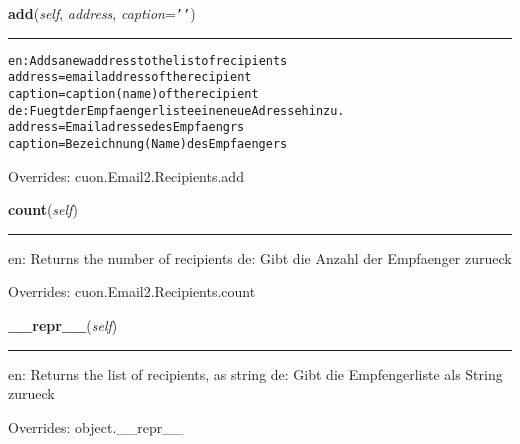 \hspace{.8\funcindent}\begin{boxedminipage}{\funcwidth}

    \raggedright \textbf{add}(\textit{self}, \textit{address}, \textit{caption}={\tt \texttt{'}\texttt{}\texttt{'}})

    \vspace{-1.5ex}

    \rule{\textwidth}{0.5\fboxrule}
\setlength{\parskip}{2ex}
\begin{alltt}

en: Adds a new address to the list of recipients
    address = email address of the recipient
    caption = caption (name) of the recipient
de: Fuegt der Empfaengerliste eine neue Adresse hinzu.
    address = Emailadresse des Empfaengrs
    caption = Bezeichnung (Name) des Empfaengers
\end{alltt}

\setlength{\parskip}{1ex}
      Overrides: cuon.Email2.Recipients.add

    \end{boxedminipage}

    \vspace{0.5ex}

\hspace{.8\funcindent}\begin{boxedminipage}{\funcwidth}

    \raggedright \textbf{count}(\textit{self})

    \vspace{-1.5ex}

    \rule{\textwidth}{0.5\fboxrule}
\setlength{\parskip}{2ex}
    en: Returns the number of recipients de: Gibt die Anzahl der Empfaenger
    zurueck

\setlength{\parskip}{1ex}
      Overrides: cuon.Email2.Recipients.count

    \end{boxedminipage}

    \vspace{0.5ex}

\hspace{.8\funcindent}\begin{boxedminipage}{\funcwidth}

    \raggedright \textbf{\_\_repr\_\_}(\textit{self})

    \vspace{-1.5ex}

    \rule{\textwidth}{0.5\fboxrule}
\setlength{\parskip}{2ex}
    en: Returns the list of recipients, as string de: Gibt die 
    Empfengerliste als String zurueck

\setlength{\parskip}{1ex}
      Overrides: object.\_\_repr\_\_

    \end{boxedminipage}

